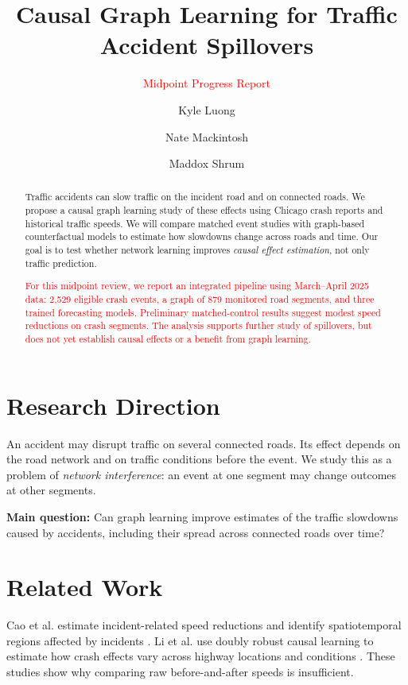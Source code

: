\documentclass[sigconf,nonacm]{acmart}
\title[Traffic Accident Spillovers]{Causal Graph Learning for Traffic Accident Spillovers}
\subtitle{\textcolor{red}{Midpoint Progress Report}}
\author{Kyle Luong}
\affiliation{\institution{University of Virginia}\city{Charlottesville}\state{Virginia}\country{USA}}
\author{Nate Mackintosh}
\affiliation{\institution{University of Virginia}\city{Charlottesville}\state{Virginia}\country{USA}}
\author{Maddox Shrum}
\affiliation{\institution{University of Virginia}\city{Charlottesville}\state{Virginia}\country{USA}}
\begin{document}
\begin{abstract}
Traffic accidents can slow traffic on the incident road and on connected
roads. We propose a causal graph learning study of these effects using
Chicago crash reports and historical traffic speeds. We will compare
matched event studies with graph-based counterfactual models to estimate
how slowdowns change across roads and time. Our goal is to test whether
network learning improves \emph{causal effect estimation}, not only
traffic prediction.

\textcolor{red}{For this midpoint review, we report an integrated
pipeline using March--April 2025 data: 2{,}529 eligible crash events,
a graph of 879 monitored road segments, and three trained forecasting
models. Preliminary matched-control results suggest modest speed
reductions on crash segments. The analysis supports further study of
spillovers, but does not yet establish causal effects or a benefit
from graph learning.}
\end{abstract}

\maketitle

\section{Research Direction}
An accident may disrupt traffic on several connected roads. Its effect
depends on the road network and on traffic conditions before the event.
We study this as a problem of \emph{network interference}: an event at
one segment may change outcomes at other segments.

\noindent\textbf{Main question:} Can graph learning improve estimates
of the traffic slowdowns caused by accidents, including their spread
across connected roads over time?

\section{Related Work}
Cao et al. estimate incident-related speed reductions and identify
spatiotemporal regions affected by incidents \cite{cao2021traffic}.
Li et al. use doubly robust causal learning to estimate how crash
effects vary across highway locations and conditions
\cite{li2024crash}. These studies show why comparing raw before-and-after
speeds is insufficient.
\end{document}
